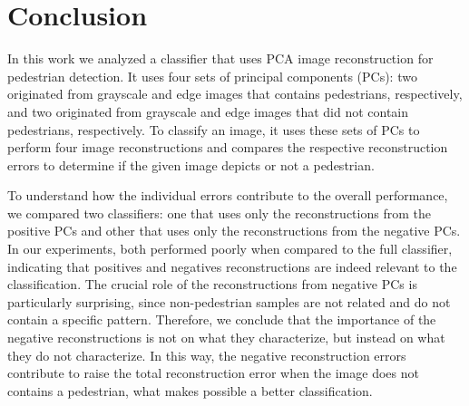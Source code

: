 \documentclass[10pt, conference, compsocconf]{IEEEtran}
\begin{document}
%





\section{Conclusion}

In this work we analyzed a classifier that uses PCA image reconstruction for pedestrian detection. It uses four sets of principal components (PCs): two originated from grayscale and edge images that contains pedestrians, respectively, and two originated from grayscale and edge images that did not contain pedestrians, respectively. To classify an image, it uses these sets of PCs to perform four image reconstructions and compares the respective reconstruction errors to determine if the given image depicts or not a pedestrian.

To understand how the individual errors contribute to the overall performance, we compared two classifiers: one that uses only the reconstructions from the positive PCs and other that uses only the reconstructions from the negative PCs. In our experiments, both performed poorly when compared to the full classifier, indicating that positives and negatives reconstructions are indeed relevant to the classification. The crucial role of the reconstructions from negative PCs is particularly surprising, since non-pedestrian samples are not related and do not contain a specific pattern. Therefore, we conclude that the importance of the negative reconstructions is not on what they characterize, but instead on what they do not characterize. In this way, the negative reconstruction errors contribute to raise the total reconstruction error when the image does not contains a pedestrian, what makes possible a better classification.
\end{document}
